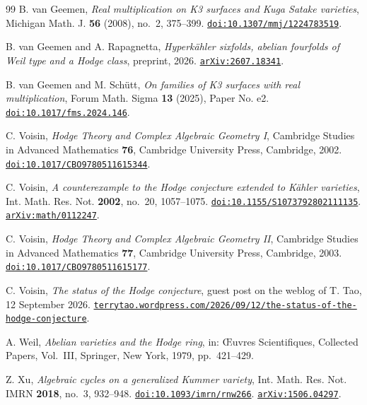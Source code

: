 \begin{thebibliography}{99}
B. van Geemen,
\emph{Real multiplication on K3 surfaces and Kuga Satake varieties},
Michigan Math. J. \textbf{56} (2008), no.~2, 375--399.
\href{https://doi.org/10.1307/mmj/1224783519}{\texttt{doi:10.1307/mmj/1224783519}}.

B. van Geemen and A. Rapagnetta,
\emph{Hyperk\"ahler sixfolds, abelian fourfolds of Weil type and a Hodge
class},
preprint, 2026.
\href{https://arxiv.org/abs/2607.18341}{\texttt{arXiv:2607.18341}}.

B. van Geemen and M. Sch\"utt,
\emph{On families of K3 surfaces with real multiplication},
Forum Math. Sigma \textbf{13} (2025), Paper No. e2.
\href{https://doi.org/10.1017/fms.2024.146}{\texttt{doi:10.1017/fms.2024.146}}.

C. Voisin,
\emph{Hodge Theory and Complex Algebraic Geometry I},
Cambridge Studies in Advanced Mathematics \textbf{76},
Cambridge University Press, Cambridge, 2002.
\href{https://doi.org/10.1017/CBO9780511615344}{\texttt{doi:10.1017/CBO9780511615344}}.

C. Voisin,
\emph{A counterexample to the Hodge conjecture extended to K\"ahler
varieties},
Int. Math. Res. Not. \textbf{2002}, no.~20, 1057--1075.
\href{https://doi.org/10.1155/S1073792802111135}{\texttt{doi:10.1155/S1073792802111135}}.
\href{https://arxiv.org/abs/math/0112247}{\texttt{arXiv:math/0112247}}.

C. Voisin,
\emph{Hodge Theory and Complex Algebraic Geometry II},
Cambridge Studies in Advanced Mathematics \textbf{77},
Cambridge University Press, Cambridge, 2003.
\href{https://doi.org/10.1017/CBO9780511615177}{\texttt{doi:10.1017/CBO9780511615177}}.

C. Voisin,
\emph{The status of the Hodge conjecture},
guest post on the weblog of T. Tao, 12 September 2026.
\href{https://terrytao.wordpress.com/2026/09/12/the-status-of-the-hodge-conjecture/}%
{\texttt{terrytao.wordpress.com/2026/09/12/the-status-of-the-hodge-conjecture}}.

A. Weil,
\emph{Abelian varieties and the Hodge ring},
in: \OE uvres Scientifiques, Collected Papers, Vol.~III,
Springer, New York, 1979, pp.~421--429.

Z. Xu,
\emph{Algebraic cycles on a generalized Kummer variety},
Int. Math. Res. Not. IMRN \textbf{2018}, no.~3, 932--948.
\href{https://doi.org/10.1093/imrn/rnw266}{\texttt{doi:10.1093/imrn/rnw266}}.
\href{https://arxiv.org/abs/1506.04297}{\texttt{arXiv:1506.04297}}.


\end{thebibliography}
